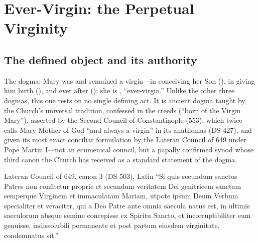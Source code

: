 \sectionguard
\section{Ever-Virgin: the Perpetual Virginity}

\subsection*{The defined object and its authority}

The dogma: Mary was and remained a virgin---in conceiving her Son
(), in giving him birth (), and ever
after (); she is , ``ever-virgin.''
Unlike the other three dogmas, this one rests on no single defining act.
It is ancient dogma taught by the Church's universal tradition, confessed
in the creeds (``born of the Virgin Mary''), asserted by the Second
Council of Constantinople (553), which twice calls Mary Mother of God
``and always a virgin'' in its anathemas (DS 427), and given its most
exact conciliar formulation by the Lateran Council of 649 under Pope
Martin I---not an ecumenical council, but a papally confirmed synod whose
third canon the Church has received as a standard statement of the
dogma.

\begin{definedtext}{Lateran Council of 649, canon 3 (DS 503), Latin}
``Si quis secundum sanctos Patres non confitetur proprie et secundum
veritatem Dei genitricem sanctam semperque Virginem et immaculatam
Mariam, utpote ipsum Deum Verbum specialiter et veraciter, qui a Deo
Patre ante omnia saecula natus est, in ultimis saeculorum absque semine
concepisse ex Spiritu Sancto, et incorruptibiliter eum genuisse,
indissolubili permanente et post partum eiusdem virginitate, condemnatus
sit.''
\end{definedtext}

